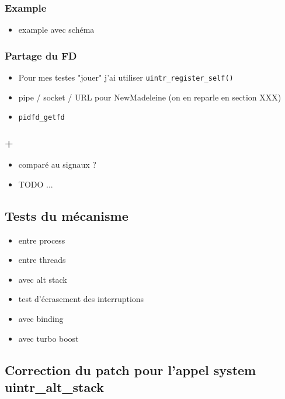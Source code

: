 \subsubsection{Example}

\begin{itemize}
  \item example avec schéma
\end{itemize}

\subsubsection{Partage du FD}

\begin{itemize}
  \item Pour mes testes "jouer" j'ai utiliser \verb|uintr_register_self()|
  \item pipe / socket / URL pour NewMadeleine (on en reparle en section XXX)
  \item \verb|pidfd_getfd|
\end{itemize}

\subsubsection{+}

\begin{itemize}
  \item comparé au signaux ?
  \item TODO ...
\end{itemize}

\subsection{Tests du mécanisme}

\begin{itemize}
  \item entre process
  \item entre threads
  \item avec alt stack
  \item test d'écrasement des interruptions
  \item avec binding
  \item avec turbo boost
\end{itemize}

\subsection{Correction du patch pour l'appel system uintr_alt_stack}

